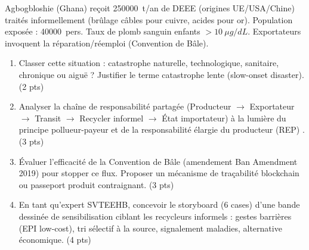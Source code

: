 \documentclass[11pt]{article}
\begin{document}
\begin{exercice}
Agbogbloshie (Ghana) reçoit \SI{250000}{t/an} de DEEE (origines UE/USA/Chine) traités informellement (brûlage câbles pour cuivre, acides pour or). Population exposée : \SI{40000}{pers}. Taux de plomb sanguin enfants $> \SI{10}{\mu g/dL}$. Exportateurs invoquent la \og réparation/réemploi \fg{} (Convention de Bâle).
\begin{enumerate}
    \item Classer cette situation : catastrophe naturelle, technologique, sanitaire, chronique ou aiguë ? Justifier le terme \og catastrophe lente \fg{} (slow-onset disaster). \hfill (2 pts)
    \item Analyser la chaîne de responsabilité partagée (Producteur $\to$ Exportateur $\to$ Transit $\to$ Recycler informel $\to$ État importateur) à la lumière du principe \og pollueur-payeur \fg{} et de la \og responsabilité élargie du producteur (REP) \fg{}. \hfill (3 pts)
    \item Évaluer l'efficacité de la Convention de Bâle (amendement Ban Amendment 2019) pour stopper ce flux. Proposer un mécanisme de traçabilité blockchain ou passeport produit contraignant. \hfill (3 pts)
    \item En tant qu'expert SVTEEHB, concevoir le storyboard (6 cases) d'une bande dessinée de sensibilisation ciblant les recycleurs informels : gestes barrières (EPI low-cost), tri sélectif à la source, signalement maladies, alternative économique. \hfill (4 pts)
\end{enumerate}
\end{exercice}
\end{document}
